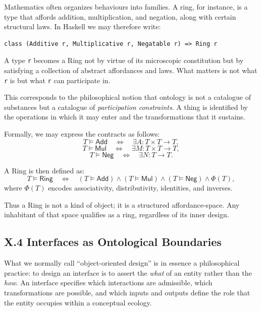 \documentclass[12pt,letterpaper]{article}
\theoremstyle{remark}
\begin{document}
Mathematics often organizes behaviours into families. A ring, for instance, is a type that affords addition, multiplication, and negation, along with certain structural laws. In Haskell we may therefore write:

\begin{verbatim}
class (Additive r, Multiplicative r, Negatable r) => Ring r
\end{verbatim}

A type \texttt{r} becomes a Ring not by virtue of its microscopic constitution but by satisfying a collection of abstract affordances and laws. What matters is not what \texttt{r} is but what \texttt{r} can participate in.

This corresponds to the philosophical notion that ontology is not a catalogue of substances but a catalogue of \emph{participation constraints}. A thing is identified by the operations in which it may enter and the transformations that it sustains.

Formally, we may express the contracts as follows:
\[
T \vDash \mathsf{Add} \quad \iff \quad \exists A : T \times T \to T,
\]
\[
T \vDash \mathsf{Mul} \quad \iff \quad \exists M : T \times T \to T,
\]
\[
T \vDash \mathsf{Neg} \quad \iff \quad \exists N : T \to T.
\]

A Ring is then defined as:
\[
T \vDash \mathsf{Ring} \quad \iff \quad 
(T \vDash \mathsf{Add}) \land 
(T \vDash \mathsf{Mul}) \land
(T \vDash \mathsf{Neg}) \land \Phi(T),
\]
where \(\Phi(T)\) encodes associativity, distributivity, identities, and inverses.

Thus a Ring is not a kind of object; it is a structured affordance-space. Any inhabitant of that space qualifies as a ring, regardless of its inner design.

\subsection{X.4 Interfaces as Ontological Boundaries}

What we normally call ``object-oriented design'' is in essence a philosophical practice: to design an interface is to assert the \emph{what} of an entity rather than the \emph{how}. An interface specifies which interactions are admissible, which transformations are possible, and which inputs and outputs define the role that the entity occupies within a conceptual ecology.
\end{document}
